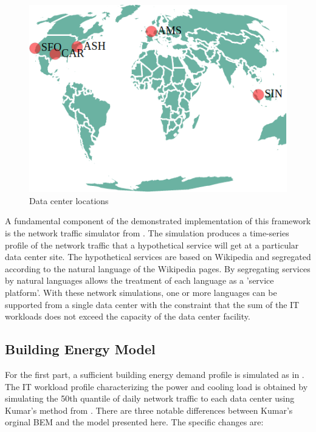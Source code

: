 \begin{figure}
  \centering
  \includegraphics[scale=.40]{marginal_energy_cost/img/dc_locations.png}
  \caption{Data center locations}
  \label{fig:dc_locations}
  \end{figure}

A fundamental component of the demonstrated implementation of this framework is the network traffic simulator from \citep{kumar20}. The simulation produces a time-series profile of the network traffic that a hypothetical service will get at a particular data center site. The hypothetical services are based on Wikipedia and segregated according to the natural language of the Wikipedia pages. By segregating services by natural languages allows the treatment of each language as a 'service platform'. With these network simulations, one or more languages can be supported from a single data center with the constraint that the sum of the IT workloads does not exceed the capacity of the data center facility. 

\subsection{Building Energy Model}
For the first part, a sufficient building energy demand profile is simulated as in \citep{kumar20}.  The IT workload profile characterizing the power and cooling load is obtained by simulating the 50th quantile of daily network traffic to each data center using Kumar’s method from \citep{kumar20b}.  There are three notable differences between Kumar's orginal BEM and the model presented here.  The specific changes are:

